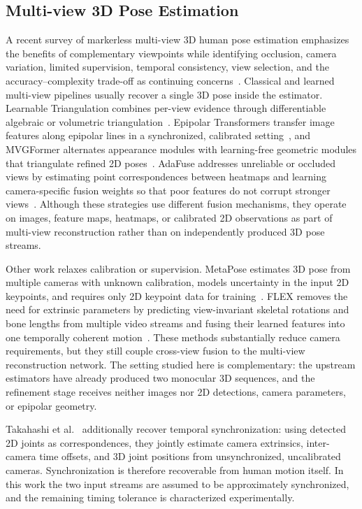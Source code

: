 \documentclass[preprint,12pt]{elsarticle}
\begin{document}
\subsection{Multi-view 3D Pose Estimation}
A recent survey of markerless multi-view 3D human pose estimation emphasizes the benefits of complementary viewpoints while identifying occlusion, camera variation, limited supervision, temporal consistency, view selection, and the accuracy--complexity trade-off as continuing concerns~\cite{nogueira2025survey}. Classical and learned multi-view pipelines usually recover a single 3D pose inside the estimator. Learnable Triangulation combines per-view evidence through differentiable algebraic or volumetric triangulation~\cite{iskakov2019learnable}. Epipolar Transformers transfer image features along epipolar lines in a synchronized, calibrated setting~\cite{he2020epipolar}, and MVGFormer alternates appearance modules with learning-free geometric modules that triangulate refined 2D poses~\cite{liao2024multiple}. AdaFuse addresses unreliable or occluded views by estimating point correspondences between heatmaps and learning camera-specific fusion weights so that poor features do not corrupt stronger views~\cite{zhang2021adafuse}. Although these strategies use different fusion mechanisms, they operate on images, feature maps, heatmaps, or calibrated 2D observations as part of multi-view reconstruction rather than on independently produced 3D pose streams.

Other work relaxes calibration or supervision. MetaPose estimates 3D pose from multiple cameras with unknown calibration, models uncertainty in the input 2D keypoints, and requires only 2D keypoint data for training~\cite{usman2022metapose}. FLEX removes the need for extrinsic parameters by predicting view-invariant skeletal rotations and bone lengths from multiple video streams and fusing their learned features into one temporally coherent motion~\cite{gordon2022flex}. These methods substantially reduce camera requirements, but they still couple cross-view fusion to the multi-view reconstruction network. The setting studied here is complementary: the upstream estimators have already produced two monocular 3D sequences, and the refinement stage receives neither images nor 2D detections, camera parameters, or epipolar geometry.

Takahashi et al.~\cite{takahashi2018human} additionally recover temporal synchronization: using detected 2D joints as correspondences, they jointly estimate camera extrinsics, inter-camera time offsets, and 3D joint positions from unsynchronized, uncalibrated cameras. Synchronization is therefore recoverable from human motion itself. In this work the two input streams are assumed to be approximately synchronized, and the remaining timing tolerance is characterized experimentally.
\end{document}
